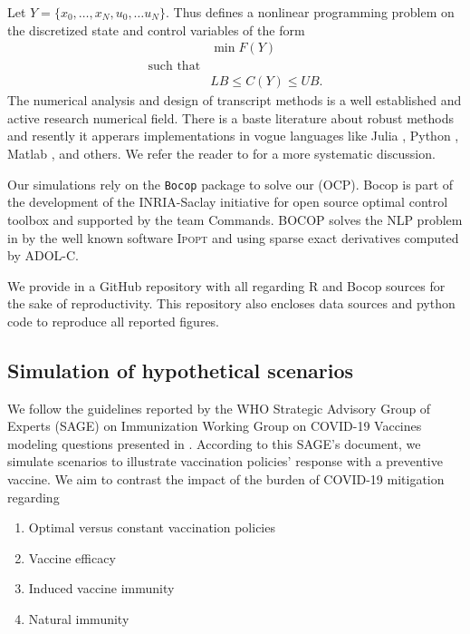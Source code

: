     Let $Y = \{x_0, \dots, x_N, u_0,\dots u_N\}$.
    Thus  defines a nonlinear programming problem on the
    discretized state and control variables of the form
    \begin{equation}
        \label{eqn:nlp_form}
        \begin{aligned}
            &
            \min F(Y)
        \\
        \text{such that} &
        \\
            &
            LB \leq C(Y) \leq UB .
        \end{aligned}
    \end{equation}
        The numerical analysis and design of transcript methods is a well
    established  and active research numerical field. There is a baste
    literature about robust methods and resently it apperars implementations in
    vogue languages like Julia
    \cite{DunningHuchetteLubin2017, LubinDunningIJOC}, Python \cite{libcmaes},
    Matlab \cite{matlabOpt}, and others. We refer the reader to
    \cite{Betts2001,Seywald1993} for a more systematic discussion.

        Our simulations rely on the \verb|Bocop| package
    \cite{Bocop,BocopExamples} to solve our (OCP). Bocop is part of the
    development of the INRIA-Saclay initiative for open source optimal control
    toolbox and supported by the team Commands. BOCOP solves the NLP problem in
     by the well known software \textsc{Ipopt} and using
    sparse exact derivatives computed by ADOL-C.

        We provide in \cite{gitHub} a GitHub repository with all regarding R
    and Bocop sources for the sake of reproductivity. This repository also
    encloses data sources and python code to reproduce all reported figures.

\subsection{Simulation of hypothetical scenarios}
        We follow the guidelines reported by the WHO Strategic Advisory Group
    of Experts (SAGE) on Immunization Working Group on COVID-19 Vaccines
    modeling questions presented in \cite{sage2020}. According to this SAGE's
    document, we simulate scenarios to illustrate vaccination policies'
    response with a preventive vaccine. We aim to contrast the impact of the
    burden of COVID-19 mitigation regarding
    \begin{enumerate}
        \item Optimal versus constant vaccination policies
        \item Vaccine efficacy
        \item Induced vaccine immunity
        \item Natural immunity
    \end{enumerate}


